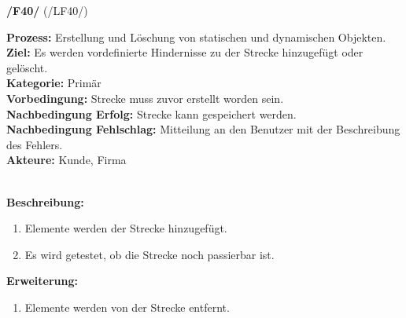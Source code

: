\documentclass[11pt,a4paper]{article}
\begin{document}
	\noindent\large\textbf{/F40/} (/LF40/)
	\normalsize\\
	\begin{addmargin}{0.1 \textwidth}
		\textbf{Prozess:} Erstellung und Löschung von statischen und dynamischen Objekten.\\
		\textbf{Ziel:} Es werden vordefinierte Hindernisse zu der Strecke hinzugefügt oder gelöscht.\\
		\textbf{Kategorie:} Primär\\
		\textbf{Vorbedingung:} Strecke muss zuvor erstellt worden sein.\\
		\textbf{Nachbedingung Erfolg:} Strecke kann gespeichert werden.\\
		\textbf{Nachbedingung Fehlschlag:} Mitteilung an den Benutzer mit der Beschreibung des Fehlers.\\
		\textbf{Akteure:} Kunde, Firma\\
		\\
		\begin{minipage}{\textwidth}
			\textbf{Beschreibung:}
			\begin{enumerate}
				\item Elemente werden der Strecke hinzugefügt.
				\item Es wird getestet, ob die Strecke noch passierbar ist.\\
			\end{enumerate}
		\end{minipage}
		\begin{minipage}{\textwidth}
			\textbf{Erweiterung:}
			\begin{enumerate}
				\item Elemente werden von der Strecke entfernt.\\
			\end{enumerate}
		\end{minipage}
	\end{addmargin}
	
\end{document}
